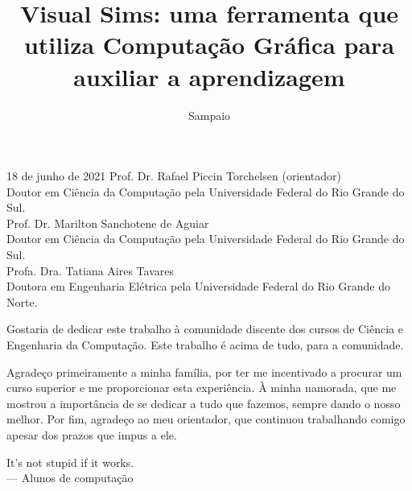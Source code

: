 \documentclass[tcc,capa]{texufpel}
\title{Visual Sims: uma ferramenta que utiliza Computação Gráfica para auxiliar a aprendizagem}
\author{Sampaio}{Letícia}
\begin{document}

\maketitle 

\sloppy

\fichacatalografica


\begin{aprovacao}{18 de junho de 2021} %
\noindent Prof. Dr. Rafael Piccin Torchelsen (orientador)\\
Doutor em Ciência da Computação pela Universidade Federal do Rio Grande do Sul.\\[1cm]

\noindent Prof. Dr. Marilton Sanchotene de Aguiar\\
Doutor em Ciência da Computação pela Universidade Federal do Rio Grande do Sul.\\[1cm]

\noindent Profa. Dra. Tatiana Aires Tavares\\
Doutora em Engenharia Elétrica pela Universidade Federal do Rio Grande do Norte.\\[1cm]

\end{aprovacao}

\begin{dedicatoria}
  Gostaria de dedicar este trabalho à comunidade discente dos cursos de Ciência e Engenharia da Computação. Este trabalho é acima de tudo, para a comunidade.
\end{dedicatoria}

\begin{agradecimentos}
  Agradeço primeiramente a minha família, por ter me incentivado a procurar um curso superior e me proporcionar esta experiência. 
  À minha namorada, que me mostrou a importância de se dedicar a tudo que fazemos, sempre dando o nosso melhor.
  Por fim, agradeço ao meu orientador, que continuou trabalhando comigo apesar dos prazos que impus a ele.
\end{agradecimentos}

\begin{epigrafe}
  It's not stupid if it works.\\
  {\sc --- Alunos de computação}
\end{epigrafe}
\end{document}
